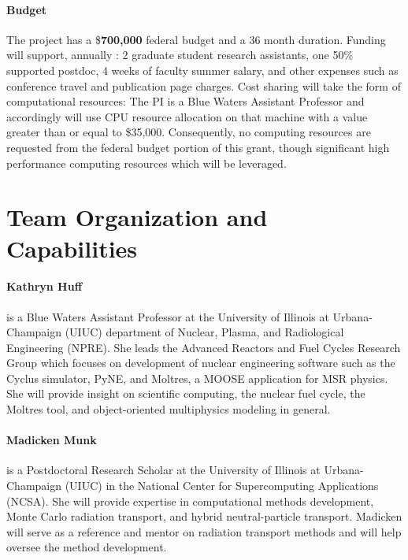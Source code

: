 \documentclass[letterpaper,12pt]{article}
\begin{document}
\paragraph{Budget} The project has a \$\textbf{700,000} federal budget and a 36 
month duration. Funding will support, annually : 2
graduate student research assistants, one 50\% supported postdoc, 4 weeks of
faculty summer salary, and other expenses such as conference travel and
publication page charges. Cost sharing will take the form of computational
resources: The PI is a Blue Waters Assistant Professor and accordingly will
use CPU resource allocation on that machine with a value greater than or equal
to \$35,000.  Consequently, no computing resources are requested from the 
federal budget portion of this grant, though significant high performance 
computing resources which will be leveraged.


\section{Team Organization and Capabilities}

\paragraph{Kathryn Huff} is a Blue Waters Assistant Professor at the University
of Illinois at Urbana-Champaign (UIUC) department of Nuclear, Plasma, and
Radiological Engineering (NPRE). She leads the Advanced Reactors and Fuel
Cycles Research Group which focuses on development of nuclear engineering
software such as the Cyclus simulator, PyNE, and Moltres, a MOOSE application
for MSR physics. She will provide insight on scientific computing, the nuclear
fuel cycle, the Moltres tool, and object-oriented multiphysics modeling in
general.

\paragraph{Madicken Munk} is a Postdoctoral Research Scholar at the University
of Illinois at Urbana-Champaign (UIUC) in the National Center for Supercomputing
Applications (NCSA). She will provide expertise in computational methods
development, Monte Carlo radiation transport, and hybrid neutral-particle
transport. Madicken will serve as a reference and mentor on radiation transport
methods and will help oversee the method development.
\end{document}
